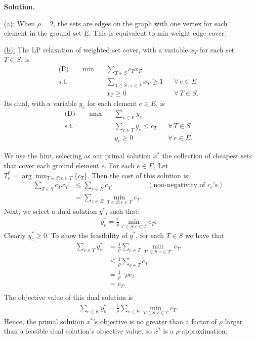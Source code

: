 \documentclass[11pt,letterpaper]{article}
\theoremstyle{definition}
\newcommand{\solution}{\medskip\noindent\textbf{Solution.}\par\medskip}
\begin{document}
\solution
\ul{(a):} When $\rho=2$, the sets are edges on the graph with one vertex for each element in the ground set $E$. 
This is equivalent to min-weight edge cover.

\ul{(b):} The LP relaxation of weighted set cover, with a variable $x_T$ for each set $T\in S$, is
\begin{align*}
    \text{(P)}\qquad \min\quad & \sum_{T\in S} c_T x_T \\
    \text{s.t.}\quad & \sum_{T\in S \,:\, e\in T} x_T \geq 1 && \forall\, e\in E \\
    & x_T \geq 0 && \forall\, T\in S.
\end{align*}
Its dual, with a variable $y_e$ for each element $e\in E$, is
\begin{align*}
    \text{(D)}\qquad \max\quad & \sum_{e\in E} y_e \\
    \text{s.t.}\quad & \sum_{e\in T} y_e \leq c_T && \forall\, T\in S \\
    & y_e \geq 0 && \forall\, e\in E.
\end{align*}

We use the hint, selecting as our primal solution $x^*$ the collection of cheapest sets that cover each ground element $e$.
For each $e\in E$, Let $T^*_e = \arg\min_{T\in S:e\in T}\{c_T\}$. Then the cost of this solution is:
\begin{align*}
    \sum_{T\in S} c_Tx_T&\leq \sum_{e\in E} c_{T^*_e} &(\text{non-negativity of $c_e$'s})\\
    &= \sum_{e\in E}\min_{T\in S:e\in T}c_T.
\end{align*}
Next, we select a dual solution $y^*$, such that:
\begin{align*}
    y^*_e = \frac{1}{\rho}\min_{T\in S: e\in T} c_T.
\end{align*}
Clearly $y^*_e\geq 0$. 
To show the feasibility of $y^*$, for each $T\in S$ we have that 
\begin{align*}
    \sum_{e\in T}y^*_e & =\frac{1}{\rho} \sum_{e\in T} \min_{T'\in S: e\in T'} c_{T'} \\
    & \leq\frac{1}{\rho} \sum_{e\in T} c_T \\
    & =\frac{1}{\rho} \cdot \rho c_T \\
    & =c_T. \\
\end{align*}
The objective value of this dual solution is 
\begin{align*}
    \sum_{e\in E} y^*_e = \frac{1}{\rho}\sum_{e\in E}\min_{T\in S:e\in T}c_T.
\end{align*}
Hence, the primal solution $x^*$'s objective is no greater than a factor of $\rho$ larger than a feasible dual solution's objective value, so $x^*$ is a $\rho$-approximation.
\end{document}
